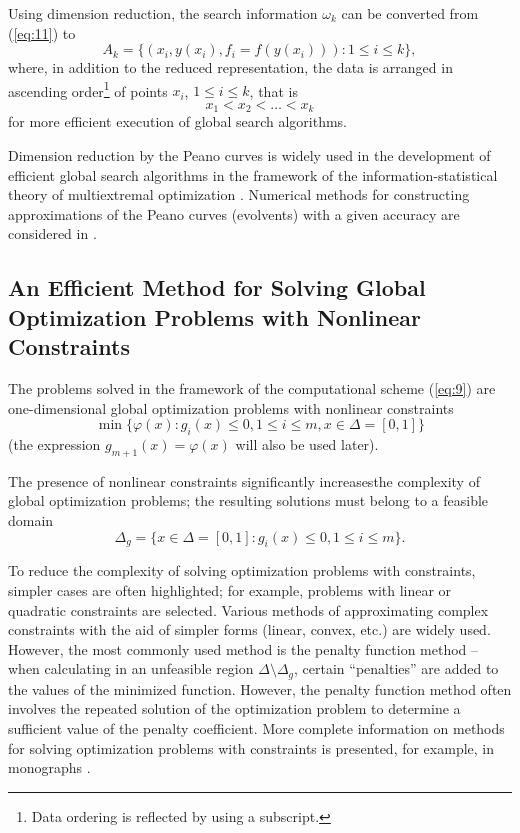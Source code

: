 \documentclass[smallextended]{svjour3}       %
\begin{document}
Using dimension reduction, the search information $\omega_k$ can be converted from (\ref{eq:11}) to 
\begin{equation}\label{eq:14}
A_k=\{(x_i, y(x_i), f_i=f(y(x_i))): 1 \leq i \leq k \},
\end{equation}
where, in addition to the reduced representation, the data is arranged in ascending order\footnote{Data ordering is reflected by using a subscript.} of points $x_i$, $1 \leq i \leq k$, that is
\begin{equation} \label{eq:15}
x_1 < x_2 < \dots < x_k	
\end{equation}
for more efficient execution of global search algorithms.

Dimension reduction by the Peano curves is widely used in the development of efficient global search algorithms in the framework of the information-statistical theory of multiextremal optimization \cite{c17,c18,c23,c26,c27}. Numerical methods for constructing approximations of the Peano curves (evolvents) with a given accuracy are considered in \cite{c17,c18}.

\subsection{An Efficient Method for Solving Global Optimization Problems with Nonlinear Constraints}

The problems solved in the framework of the computational scheme (\ref{eq:9}) are one-dimensional global optimization problems with nonlinear constraints
\begin{equation}\label{eq:16}
\min{\{\varphi(x):g_i(x)\leq 0, 1 \leq i \leq m, x\in \Delta=[0,1]\}}
\end{equation}
(the expression $g_{m+1}(x) = \varphi(x)$ will also be used later).

The presence of nonlinear constraints significantly increasesthe complexity of global optimization problems; the resulting solutions must belong to a feasible domain
\begin{equation}\label{eq:17}
\Delta_g  = \{ x\in \Delta=[0,1]:g_i(x)\leq 0, 1 \leq i \leq m \}.
\end{equation}

To reduce the complexity of solving optimization problems with constraints, simpler cases are often highlighted; for example, problems with linear or quadratic constraints are selected. Various methods of approximating complex constraints with the aid of simpler forms (linear, convex, etc.) are widely used. However, the most commonly used method is the penalty function method -- when calculating in an unfeasible region $\Delta \setminus \Delta_g$, certain ``penalties'' are added to the values of the minimized function. However, the penalty function method often involves the repeated solution of the optimization problem to determine a sufficient value of the penalty coefficient. More complete information on methods for solving optimization problems with constraints is presented, for example, in monographs \cite{c28,c29}.
\end{document}
